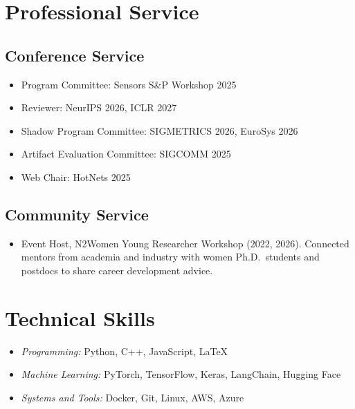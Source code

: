 \documentclass[11pt,letterpaper]{article}
\begin{document}
\section{Professional Service}

\subsection{Conference Service}
\begin{itemize}[label={},leftmargin=0pt]
  \item Program Committee: Sensors S\&P Workshop 2025
  \item Reviewer: NeurIPS 2026, ICLR 2027
  \item Shadow Program Committee: SIGMETRICS 2026, EuroSys 2026
  \item Artifact Evaluation Committee: SIGCOMM 2025
  \item Web Chair: HotNets 2025
\end{itemize}

\subsection{Community Service}
\begin{itemize}[label={},leftmargin=0pt]
  \item Event Host, N2Women Young Researcher Workshop (2022, 2026). Connected mentors from academia and industry with women Ph.D.\ students and postdocs to share career development advice.
\end{itemize}


\section{Technical Skills}

\begin{itemize}[label={},leftmargin=0pt]
  \item \textit{Programming:} Python, C++, JavaScript, \LaTeX
  \item \textit{Machine Learning:} PyTorch, TensorFlow, Keras, LangChain, Hugging Face
  \item \textit{Systems and Tools:} Docker, Git, Linux, AWS, Azure
\end{itemize}
\end{document}
